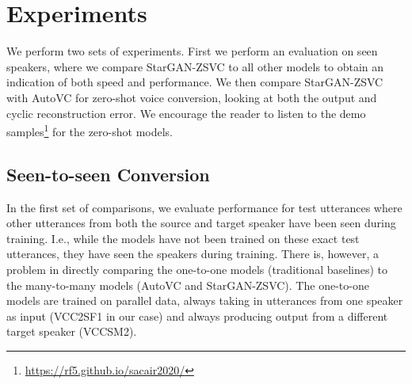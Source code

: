 
\section{Experiments}
We perform two sets of experiments.
First we perform an evaluation on seen speakers, where we compare StarGAN-ZSVC to all other models to obtain an indication of both speed and performance.
We then compare StarGAN-ZSVC with AutoVC for zero-shot voice conversion, 
looking at both the output and cyclic reconstruction error.
We encourage the reader to listen to the demo samples\footnote{\url{https://rf5.github.io/sacair2020/}} for the zero-shot models. 

\subsection{Seen-to-seen Conversion} \label{sec:experiments_seen}

In the first set of comparisons, we evaluate
performance for test utterances where other utterances from both the source and target speaker have been seen during training. I.e., while the models have not been trained on these exact test utterances, they have seen the speakers during training.
There is, however, a problem in directly comparing the one-to-one models (traditional baselines) to the many-to-many models (AutoVC and StarGAN-ZSVC).
The one-to-one models are trained on parallel data, always taking in utterances from one speaker as input (VCC2SF1 in our case) and always producing output from a different target speaker (VCCSM2).

